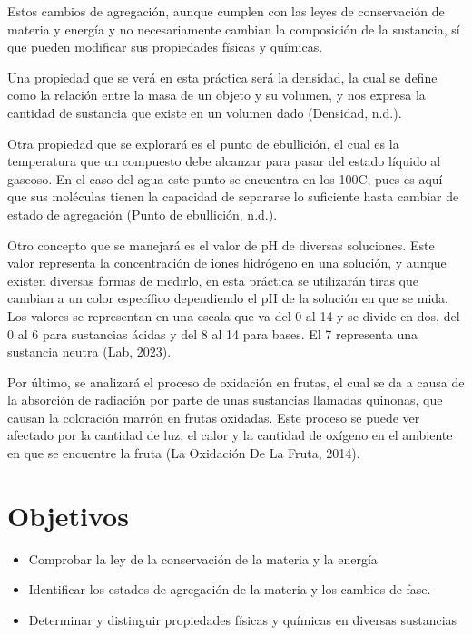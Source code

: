 Estos cambios de agregación, aunque cumplen con las leyes de conservación de materia y energía y no necesariamente cambian la composición de la sustancia, sí que pueden modificar sus propiedades físicas y químicas.

Una propiedad que se verá en esta práctica será la densidad, la cual se define como la relación entre la masa de un objeto y su volumen, y nos expresa la cantidad de sustancia que existe en un volumen dado (Densidad, n.d.).

Otra propiedad que se explorará es el punto de ebullición, el cual es la temperatura que un compuesto debe alcanzar para pasar del estado líquido al gaseoso. En el caso del agua este punto se encuentra en los 100C, pues es aquí que sus moléculas tienen la capacidad de separarse lo suficiente hasta cambiar de estado de agregación (Punto de ebullición, n.d.).

Otro concepto que se manejará es el valor de pH de diversas soluciones. Este valor representa la concentración de iones hidrógeno en una solución, y aunque existen diversas formas de medirlo, en esta práctica se utilizarán tiras que cambian a un color específico dependiendo el pH de la solución en que se mida. Los valores se representan en una escala que va del 0 al 14 y se divide en dos, del 0 al 6 para sustancias ácidas y del 8 al 14 para bases. El 7 representa una sustancia neutra (Lab, 2023).

Por último, se analizará el proceso de oxidación en frutas, el cual se da a causa de la absorción de radiación por parte de unas sustancias llamadas quinonas, que causan la coloración marrón en frutas oxidadas. Este proceso se puede ver afectado por la cantidad de luz, el calor y la cantidad de oxígeno en el ambiente en que se encuentre la fruta (La Oxidación De La Fruta, 2014).

\section{Objetivos}

\begin{itemize}
    \item Comprobar la ley de la conservación de la materia y la energía
    \item Identificar los estados de agregación de la materia y los cambios de fase.
    \item Determinar y distinguir propiedades físicas y químicas en diversas sustancias
\end{itemize}

